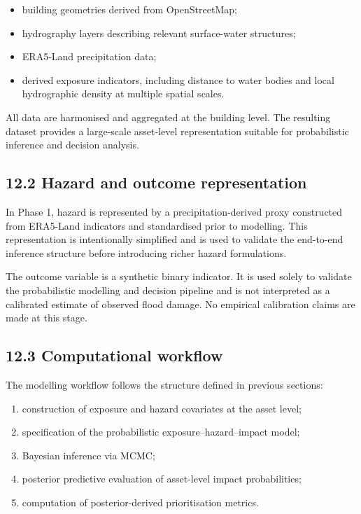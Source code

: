 \documentclass[
]{article}
\providecommand{\tightlist}{%
  \setlength{\itemsep}{0pt}\setlength{\parskip}{0pt}}
\begin{document}
\begin{itemize}
\tightlist
\item
  building geometries derived from OpenStreetMap;
\item
  hydrography layers describing relevant surface-water structures;
\item
  ERA5-Land precipitation data;
\item
  derived exposure indicators, including distance to water bodies and
  local hydrographic density at multiple spatial scales.
\end{itemize}

All data are harmonised and aggregated at the building level. The
resulting dataset provides a large-scale asset-level representation
suitable for probabilistic inference and decision analysis.

\subsection{12.2 Hazard and outcome
representation}\label{hazard-and-outcome-representation}

In Phase 1, hazard is represented by a precipitation-derived proxy
constructed from ERA5-Land indicators and standardised prior to
modelling. This representation is intentionally simplified and is used
to validate the end-to-end inference structure before introducing richer
hazard formulations.

The outcome variable is a synthetic binary indicator. It is used solely
to validate the probabilistic modelling and decision pipeline and is not
interpreted as a calibrated estimate of observed flood damage. No
empirical calibration claims are made at this stage.

\subsection{12.3 Computational workflow}\label{computational-workflow}

The modelling workflow follows the structure defined in previous
sections:

\begin{enumerate}
\def\labelenumi{\arabic{enumi}.}
\tightlist
\item
  construction of exposure and hazard covariates at the asset level;
\item
  specification of the probabilistic exposure--hazard--impact model;
\item
  Bayesian inference via MCMC;
\item
  posterior predictive evaluation of asset-level impact probabilities;
\item
  computation of posterior-derived prioritisation metrics.
\end{enumerate}
\end{document}
